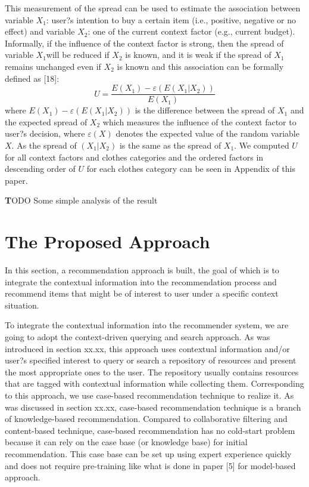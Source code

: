 This measurement of the spread can be used to estimate the association between variable $X_1$:  user?s intention to buy a certain item (i.e., positive, negative or no effect) and variable $X_2$: one of the current context factor (e.g., current budget). Informally, if the influence of the context factor is strong, then the spread of variable $X_1$will be reduced if $X_2$ is known, and it is weak if the spread of $X_1$ remains unchanged even if $X_2$ is known and this association can be formally defined as [18]:
$$U=\frac{E(X_1)-\varepsilon(E(X_1|X_2))}{E(X_1)}$$
where $E(X_1)-\varepsilon(E(X_1|X_2))$ is the difference between the spread of $X_1$ and the expected spread of $X_2$ which measures the influence of the context factor to user?s decision, where $\varepsilon(X)$ denotes the expected value of the random variable $X$. As the spread of $(X_1|X_2)$ is the same as the spread of $X_1$. We computed $U$ for all context factors and clothes categories and the ordered factors in descending order of $U$ for each clothes category can be seen in Appendix of this paper.

\textbf TODO Some simple analysis of the result

\section{The Proposed Approach} \label{sec:pa}

In this section, a recommendation approach is built, the goal of which is to integrate the contextual information into the recommendation process and recommend items that might be of interest to user under a specific context situation.

To integrate the contextual information into the recommender system, we are going to adopt the context-driven querying and search approach. As was introduced in section xx.xx, this approach uses contextual information and/or user?s specified interest to query or search a repository of resources and present the most appropriate ones to the user. The repository usually contains resources that are tagged with contextual information while collecting them. Corresponding to this approach, we use case-based recommendation technique to realize it. As was discussed in section xx.xx, case-based recommendation technique is a branch of knowledge-based recommendation. Compared to collaborative filtering and content-based technique, case-based recommendation has no cold-start problem because it can rely on the case base (or knowledge base) for initial recommendation. This case base can be set up using expert experience quickly and does not require pre-training like what is done in paper [5] for model-based approach. 

